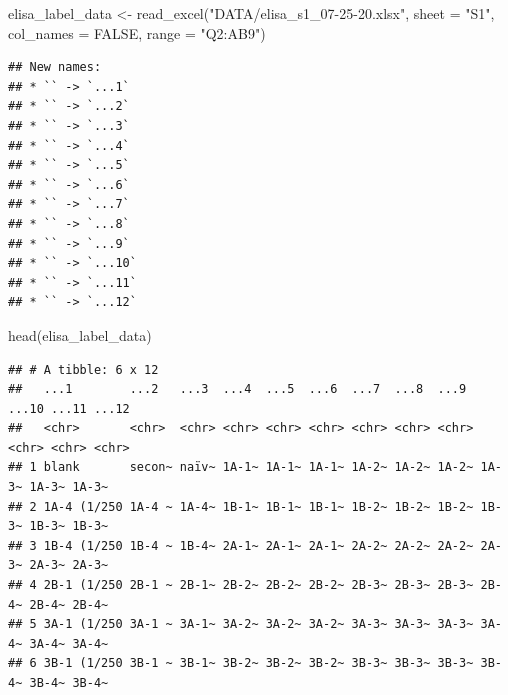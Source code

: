 \documentclass[
]{book}
\newenvironment{Shaded}{\begin{snugshade}}{\end{snugshade}}
\newcommand{\AttributeTok}[1]{\textcolor[rgb]{0.77,0.63,0.00}{#1}}
\newcommand{\ConstantTok}[1]{\textcolor[rgb]{0.00,0.00,0.00}{#1}}
\newcommand{\FunctionTok}[1]{\textcolor[rgb]{0.00,0.00,0.00}{#1}}
\newcommand{\NormalTok}[1]{#1}
\newcommand{\OtherTok}[1]{\textcolor[rgb]{0.56,0.35,0.01}{#1}}
\newcommand{\StringTok}[1]{\textcolor[rgb]{0.31,0.60,0.02}{#1}}
\begin{document}
\begin{Shaded}
\begin{Highlighting}[]
\NormalTok{elisa\_label\_data }\OtherTok{\textless{}{-}} \FunctionTok{read\_excel}\NormalTok{(}\StringTok{"DATA/elisa\_s1\_07{-}25{-}20.xlsx"}\NormalTok{, }\AttributeTok{sheet =} \StringTok{"S1"}\NormalTok{, }\AttributeTok{col\_names =} \ConstantTok{FALSE}\NormalTok{,  }\AttributeTok{range =} \StringTok{"Q2:AB9"}\NormalTok{)}
\end{Highlighting}
\end{Shaded}

\begin{verbatim}
## New names:
## * `` -> `...1`
## * `` -> `...2`
## * `` -> `...3`
## * `` -> `...4`
## * `` -> `...5`
## * `` -> `...6`
## * `` -> `...7`
## * `` -> `...8`
## * `` -> `...9`
## * `` -> `...10`
## * `` -> `...11`
## * `` -> `...12`
\end{verbatim}

\begin{Shaded}
\begin{Highlighting}[]
\FunctionTok{head}\NormalTok{(elisa\_label\_data)}
\end{Highlighting}
\end{Shaded}

\begin{verbatim}
## # A tibble: 6 x 12
##   ...1        ...2   ...3  ...4  ...5  ...6  ...7  ...8  ...9  ...10 ...11 ...12
##   <chr>       <chr>  <chr> <chr> <chr> <chr> <chr> <chr> <chr> <chr> <chr> <chr>
## 1 blank       secon~ naïv~ 1A-1~ 1A-1~ 1A-1~ 1A-2~ 1A-2~ 1A-2~ 1A-3~ 1A-3~ 1A-3~
## 2 1A-4 (1/250 1A-4 ~ 1A-4~ 1B-1~ 1B-1~ 1B-1~ 1B-2~ 1B-2~ 1B-2~ 1B-3~ 1B-3~ 1B-3~
## 3 1B-4 (1/250 1B-4 ~ 1B-4~ 2A-1~ 2A-1~ 2A-1~ 2A-2~ 2A-2~ 2A-2~ 2A-3~ 2A-3~ 2A-3~
## 4 2B-1 (1/250 2B-1 ~ 2B-1~ 2B-2~ 2B-2~ 2B-2~ 2B-3~ 2B-3~ 2B-3~ 2B-4~ 2B-4~ 2B-4~
## 5 3A-1 (1/250 3A-1 ~ 3A-1~ 3A-2~ 3A-2~ 3A-2~ 3A-3~ 3A-3~ 3A-3~ 3A-4~ 3A-4~ 3A-4~
## 6 3B-1 (1/250 3B-1 ~ 3B-1~ 3B-2~ 3B-2~ 3B-2~ 3B-3~ 3B-3~ 3B-3~ 3B-4~ 3B-4~ 3B-4~
\end{verbatim}
\end{document}
